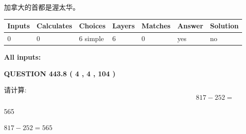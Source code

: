 \documentclass{ctexart}
\begin{document}
 
加拿大的首都是渥太华。
 
 
\noindent{}
 
 
   
   
   
   
\noindent\begin{tabular}{|l|l|l|l|l|l|l|}
 \hline
Inputs & Calculates & Choices & Layers & Matches & Answer & Solution \\ \hline
 0  & 
 0  & 
 6
  simple  
  & 
 6  & 
 0  & 
  yes & 
  no 
  \\ \hline
 \end{tabular}
   
   
   
   
\noindent{}
   
   
   
   
\noindent\vspace{0.1in}\hspace{-0.08in} {\textbf{\Large{All inputs: }}}
   
   
  
\vspace{0.2in}
  
{\textbf{\Large{QUESTION
443.8 
 ( 4 , 4 , 104 )
}}}
  
  
 
请计算:
\begin{equation}
817 -   %
252 = \nonumber
\end{equation}
 
 
 
\noindent{}
 
 

565
 
 
\noindent{}
 
 

 
 
 
\noindent{}
 
 

$ %
817 -  %
252=   %
565$
 
 
\noindent{}
 
\end{document}
